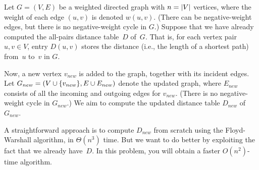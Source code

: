 \documentclass[11pt,addpoints,answers]{exam}
\begin{document}
\begin{questions}
  Let $G=(V, E)$ be a weighted directed graph with $n=\lvert V\rvert$ vertices, where the weight of each edge $(u,v)$ is denoted $w(u,v)$.
  (There can be negative-weight edges, but there is no negative-weight cycle in $G$.)
  Suppose that we have already computed the all-pairs distance table~$D$ of~$G$.
  That is, for each vertex pair $u,v \in V$, entry $D(u,v)$ stores the distance (i.e., the length of a shortest path) from~$u$ to~$v$ in $G$.

  Now, a new vertex $v_{new}$ is added to the graph, together with its incident edges.
  Let $G_{new} = (V \cup \{v_{new}\}, E \cup E_{new})$ denote the updated graph, where $E_{new}$ consists of all the incoming and outgoing edges for $v_{new}$.
  (There is no negative-weight cycle in $G_{new}$.)
  We aim to compute the updated distance table $D_{new}$ of~$G_{new}$.

  A straightforward approach is to compute $D_{new}$ from scratch using the Floyd-Warshall algorithm, in $\Theta(n^3)$ time.
  But we want to do better by exploiting the fact that we already have~$D$.
  In this problem, you will obtain a faster $O(n^2)$-time algorithm.

\end{questions}
\end{document}

